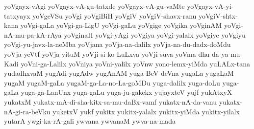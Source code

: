 {yoVgayx-vAgi
yoVgayx-vA-gu-tatxde
yoVgayx-vA-gu-vaMte
yoVgayx-vA-yi-tatxyayx
yoVgeVSu
yoVgi
yoVgiBiH
yoVgiV
yoVgiV-shavx-ranu
yoVgiV-shtx-kana
yoVgi-gaLa
yoVgi-ga-LigU
yoVgi-gaLu
yoVgige
yoVgika
yoVginAM
yoVgi-nA-mu-pa-kA-rAya
yoVginaH
yoVgi-yAgi
yoVgiya
yoVgi-yalalx
yoVgiye
yoVgiyu
yoVgi-yu-javx-la-neMba
yoVjana
yoVja-na-dalilx
yoVja-na-du-dadx-doMdu
yoVja-yeVtf
yoVja-yituM
yoVji-si-ko-LuLxva
yoVji-suva
yoVma-dhu-da-ya-mu-Kadi
yoVni-ga-Lalilx
yoVniya
yoVni-yalilx
yoVnw
yono-lemx-yiMda
yuLALx-tana
yudadhxvaM
yugAdi
yugAdw
yugAnAM
yuga-BeV-deVna
yugaLa
yugaLaM
yugaM
yugaM-gaLa
yugaM-ga-La-no-La-goMDu
yuga-dalilx
yuga-doLu
yuga-gaLa
yuga-ga-LanUnx
yuga-gaLu
yuga-ju-gakekx
yujayxteV
yujf
yukAtxyX
yukatxM
yukatx-mA-di-sha-kitx-sa-mu-daBx-vamf
yukatx-nA-da-vanu
yukatx-nA-gi-ra-beVku
yuketxV
yukf
yukitx
yukitx-yalalx
yukitx-yiMda
yukitx-yilalx
yutarA
ywgi-ka-rA-gali
ywvana
ywvanaM
ywva-na-mada
}
